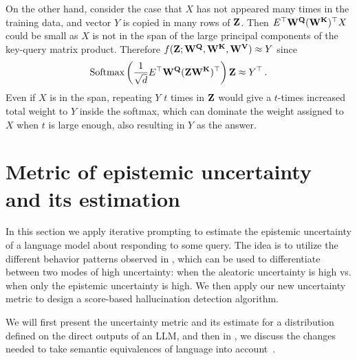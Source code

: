 \documentclass[a4paper]{article}
\theoremstyle{plain}
\theoremstyle{definition}
\theoremstyle{plain}
\begin{document}
On the other hand, consider the case that $X$ has not appeared many times in the training data, and vector $Y$ is copied in many rows of ${\mathbf{Z}}$. Then $E^\top  {\mathbf{W^Q}} ({\mathbf{W^K}})^\top X$ could be small as $X$ is not in the span of the large principal components of the key-query matrix product.
Therefore $f({\mathbf{Z}}; {\mathbf{W^Q}},{\mathbf{W^K}},{\mathbf{W^V}}) \approx Y$ since
\[
\text{Softmax}\left( \frac{1}{\sqrt{d}} E^\top {\mathbf{W^Q}} ({\mathbf{Z}} {\mathbf{W^K}})^\top  \right) {\mathbf{Z}} \approx Y^\top \,.
\]
%
Even if $X$ is in the span, repeating $Y$ $t$ times in ${\mathbf{Z}}$  would give a $t$-times increased total weight to $Y$ inside the softmax, which can dominate the weight assigned to $X$ when $t$ is large enough, also resulting in $Y$ as the answer.

%
\section{Metric of epistemic uncertainty and its estimation}
\label{sec:epistemic}

In this section we apply iterative prompting to estimate the epistemic uncertainty of a language model about responding to some query. The idea is to utilize the different behavior patterns observed in , which can be used to differentiate between two modes of high uncertainty: when the aleatoric uncertainty is high vs. when only the epistemic uncertainty is high. We then apply our new uncertainty metric to design a score-based hallucination detection algorithm. 

We will first present the uncertainty metric and its estimate for a distribution defined on the direct outputs of an LLM, and then in , we discuss the changes needed to take semantic equivalences of language into account~\citep{KuhnARXIV2023,FKKG-2024}.    
\end{document}
